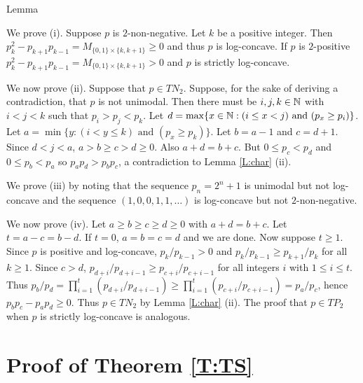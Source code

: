 \documentclass[12pt]{article}
\begin{document}
\begin{proofof}{Lemma}

We prove (i).  Suppose $p$ is $2$-non-negative.  Let $k$ be a positive integer. Then $p_k^2 - p_{k+1}p_{k-1} = M_{\{0,1\} \times\{k,k+1\}} \geq 0$ and thus $p$ is log-concave.  If $p$ is $2$-positive $p_k^2 - p_{k+1}p_{k-1} = M_{\{0,1\} \times\{k,k+1\}} > 0$ and $p$ is strictly log-concave.

We now prove (ii).  Suppose that $p \in TN_2$. Suppose, for the sake of deriving a contradiction, that $p$ is not unimodal.  Then there must be $i, j, k \in \mathbb{N}$ with $i < j < k$ such that $p_i > p_j < p_k$.  Let $d = \max \{x \in \mathbb{N}: (i \leq x < j) \text{ and } (p_x \geq p_i)\}$.  Let $a = \min\{y : (i < y \leq k) \text{ and } (p_x \geq p_k)\}$.  Let $b = a-1$ and $c = d+1$.  Since $ d < j < a$, $a > b \geq c > d \geq 0$. Also $a+d=b+c$.  But $0 \leq p_c < p_d$ and $0 \leq p_b < p_a$ so $p_a p_d > p_b p_c$, a contradiction to Lemma \ref{L:char} (ii).

We prove (iii) by noting that the sequence $p_n = 2^n+1$ is unimodal but not log-concave and the sequence $(1,0,0,1,1, \ldots)$ is log-concave but not $2$-non-negative.

We now prove (iv). Let $a \geq b \geq c \geq d \geq 0$ with $a+d=b+c$.  Let $t=a-c=b-d$.  If $t=0$, $a=b=c=d$ and we are done.  Now suppose $t \geq 1$.  Since $p$ is positive and log-concave, $p_k/p_{k-1} > 0$ and $p_k/p_{k-1} \geq p_{k+1}/p_k$ for all $k \geq 1$.  Since $c > d$, $p_{d+i}/p_{d+i-1} \geq p_{c+i}/p_{c + i - 1}$ for all integers $i$ with $1 \leq i \leq t$.  Thus $p_b/p_d = \prod_{i=1}^t (p_{d+i}/p_{d+i-1}) \geq \prod_{i=1}^t (p_{c+i}/p_{c+i-1}) = p_a/p_c$, hence $p_b p_c - p_a p_d \geq 0$.  Thus $p \in TN_2$ by Lemma \ref{L:char} (ii).  The proof that $p \in TP_2$ when $p$ is strictly log-concave is analogous.


\end{proofof}


\section{Proof of Theorem \ref{T:TS}} \label{S:non-neg}
\end{document}
